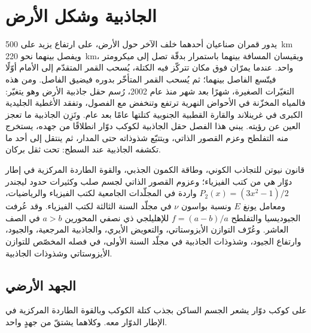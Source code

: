 \chapter{الجاذبية وشكل الأرض}\label{ch:b3:gravity-geodesy}

يدور قمران صناعيان أحدهما خلف الآخر حول الأرض، على ارتفاع يزيد على
\qty{500}{km} ويفصل بينهما نحو \qty{220}{km}، ويقيسان المسافة بينهما
باستمرار بدقّة تصل إلى ميكرومتر واحد.
عندما يمرّان فوق مكان تتركّز فيه الكتلة، يُسحب القمر المتقدّم إلى الأمام أوّلًا فيتّسع
الفاصل بينهما؛ ثم يُسحب القمر المتأخّر بدوره
فيضيق الفاصل. ومن هذه التغيّرات الصغيرة، شهرًا بعد شهر منذ عام 2002،
رُسم حقل جاذبية الأرض وهو يتغيّر: فالمياه المخزّنة في
الأحواض النهرية ترتفع وتنخفض مع الفصول، وتفقد الأغطية الجليدية الكبرى في
غرينلاند والقارة القطبية الجنوبية كتلتها عامًا بعد عام. وتَزِن الجاذبية ما تعجز العين
عن رؤيته. يبني هذا الفصل حقل الجاذبية لكوكب دوّار انطلاقًا من جهده،
يستخرج منه التفلطح وعزم القصور الذاتي، ويتتبّع
شذوذاته حتى المدار، ثم ينتقل إلى أحد ما تكشفه الجاذبية عند
السطح:  تحت ثقل بركان.

\begin{recall}
قانون نيوتن للتجاذب الكوني، وطاقة الكمون الجذبي،
والقوة الطاردة المركزية في إطار دوّار هي من كتب الفيزياء؛ وعزوم القصور الذاتي
لجسم صلب وكثيرات حدود ليجندر $P_2(x) = (3x^2 - 1)/2$ واردة في
المجلّدات الجامعية لكتب الفيزياء والرياضيات، ومعامل يونغ $E$
ونسبة بواسون $\nu$ في مجلّد السنة الثالثة لكتب الفيزياء. وقد عُرفت الجيوديسيا
والتفلطح $f = (a - b)/a$ للإهليلجي ذي نصفي المحورين $a > b$ في
الصف العاشر. وعُرّف التوازن الأيزوستاتي، والتعويض الأيري، والجاذبية المرجعية، والجيود،
وارتفاع الجيود، وشذوذات الجاذبية في مجلّد السنة الأولى، في فصله
المخصّص للتوازن الأيزوستاتي وشذوذات الجاذبية.
\end{recall}

\section{الجهد الأرضي}

على كوكب دوّار يشعر الجسم الساكن بجذب كتلة الكوكب
وبالقوة الطاردة المركزية في الإطار الدوّار معه. وكلاهما يشتقّ من
جهدٍ واحد.


